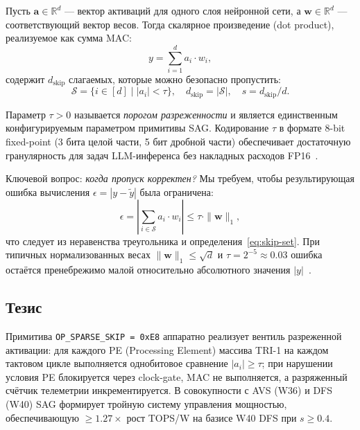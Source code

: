 Пусть $\mathbf{a} \in \mathbb{R}^{d}$ — вектор активаций для одного
слоя нейронной сети, а $\mathbf{w} \in \mathbb{R}^{d}$ — соответствующий
вектор весов.  Тогда скалярное произведение (dot product), реализуемое
как сумма MAC:
\begin{equation}
  y = \sum_{i=1}^{d} a_i \cdot w_i,
  \label{eq:dotprod}
\end{equation}
содержит $d_{\text{skip}}$ слагаемых, которые можно безопасно пропустить:
\begin{equation}
  \mathcal{S} = \{ i \in [d] \mid |a_i| < \tau \},
  \quad
  d_{\text{skip}} = |\mathcal{S}|, \quad s = d_{\text{skip}} / d.
  \label{eq:skip-set}
\end{equation}

Параметр $\tau > 0$ называется \emph{порогом разреженности} и является
единственным конфигурируемым параметром примитивы SAG.
Кодирование $\tau$ в формате 8-bit fixed-point (3 бита целой части,
5 бит дробной части) обеспечивает достаточную гранулярность для
задач LLM-инференса без накладных расходов FP16~\cite{Rabaey-DIC2}.

Ключевой вопрос: \emph{когда пропуск корректен?}
Мы требуем, чтобы результирующая ошибка вычисления
$\epsilon = |y - \tilde{y}|$ была ограничена:
\begin{equation}
  \epsilon = \left|\sum_{i \in \mathcal{S}} a_i \cdot w_i\right|
  \leq \tau \cdot \|\mathbf{w}\|_1,
  \label{eq:error-bound}
\end{equation}
что следует из неравенства треугольника и определения~\eqref{eq:skip-set}.
При типичных нормализованных весах $\|\mathbf{w}\|_1 \leq \sqrt{d}$
и $\tau = 2^{-5} \approx 0{.}03$ ошибка остаётся пренебрежимо малой
относительно абсолютного значения $|y|$~\cite{hoefler2021sparsity}.


\subsection{Тезис}
\label{ssec:glava87-thesis}

Примитива \texttt{OP\_SPARSE\_SKIP = 0xE8} аппаратно реализует
вентиль разреженной активации: для каждого PE (Processing Element)
массива TRI-1 на каждом тактовом цикле выполняется однобитовое сравнение
$|a_i| \geq \tau$; при нарушении условия PE блокируется через
clock-gate, MAC не выполняется, а разряженный счётчик телеметрии
инкрементируется.  В совокупности с AVS (W36) и DFS (W40) SAG формирует
тройную систему управления мощностью, обеспечивающую $\geq 1{.}27\times$
рост TOPS/W на базисе W40 DFS при $s \geq 0{.}4$.


